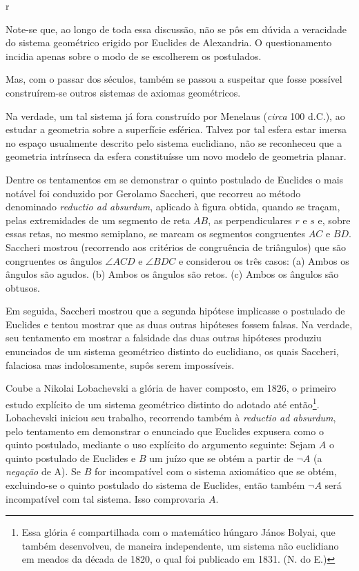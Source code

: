 r\documentclass{hipatia}
\begin{document}
Note-se que, ao longo de toda essa discussão, não se pôs em dúvida a veracidade do sistema geométrico erigido por Euclides de Alexandria. O questionamento incidia apenas sobre o modo de se escolherem os postulados. 

Mas, com o passar dos séculos, também se passou a suspeitar que fosse possível construírem-se outros sistemas de axiomas geométricos. 

Na verdade, um tal sistema já fora construído por Menelaus (\emph{circa} 100 d.C.), ao estudar a geometria sobre a superfície esférica. Talvez por tal esfera estar imersa no espaço usualmente descrito pelo sistema euclidiano, não se reconheceu que a geometria intrínseca da esfera constituísse um novo modelo de geometria planar.  \cite[p. 57]{struik1987} 

Dentre os tentamentos em se demonstrar o quinto postulado de Euclides o mais notável foi conduzido por Gerolamo Saccheri, que recorreu ao método denominado \emph{reductio ad absurdum}, aplicado à figura obtida, quando se traçam, pelas extremidades de um segmento de reta $AB$, as perpendiculares $r$ e $s$ e, sobre essas retas, no mesmo semiplano, se marcam os segmentos congruentes $AC$ e $BD$. Saccheri mostrou (recorrendo aos critérios de congruência de triângulos) que são congruentes os ângulos $\angle ACD$ e $\angle BDC$ e considerou os três casos: 
(a)  Ambos os ângulos são agudos. 
(b)  Ambos os ângulos são retos. 
(c)  Ambos os ângulos são obtusos.

Em seguida, Saccheri mostrou que a segunda hipótese implicasse o postulado de Euclides e tentou mostrar que as duas outras hipóteses fossem falsas. Na verdade, seu tentamento em mostrar a falsidade das duas outras hipóteses produziu enunciados de um sistema geométrico distinto do euclidiano, os quais Saccheri, falaciosa mas indolosamente, supôs serem impossíveis.  \cite[p. 182]{kneebone1963}

Coube a Nikolai Lobachevski a glória de haver composto, em 1826, o primeiro estudo explícito de um sistema geométrico distinto do adotado até então\footnote{
Essa glória é compartilhada com o matemático húngaro
János Bolyai, que também desenvolveu, de maneira independente, um sistema não euclidiano em meados da década de 1820, o qual foi publicado em 1831.  
(N. do E.)}. Lobachevski iniciou seu trabalho, recorrendo também à \emph{reductio ad absurdum}, pelo tentamento em demonstrar o enunciado que Euclides expusera como o quinto postulado, mediante o uso explícito do argumento seguinte: Sejam $A$ o quinto postulado de Euclides e $B$ um juízo que se obtém a partir de $\neg A$  (a \emph{negação} de A). Se $B$ for incompatível com o sistema axiomático que se obtém, excluindo-se o quinto postulado do sistema de Euclides, então também $\neg A$ será incompatível com tal sistema. Isso comprovaria $A$.   \cite[p. 29]{bachelard1934}\cite[p. 388]{kneale}\cite[p. 13--14]{smogorzhevski1976}      
\end{document}
